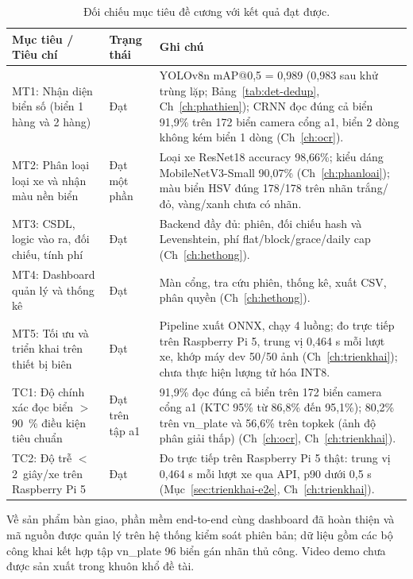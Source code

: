 \begin{table}[htbp]
\centering
\caption{Đối chiếu mục tiêu đề cương với kết quả đạt được.}

\label{tab:muctieu}
\begin{tabular}{p{5cm}p{2cm}p{6cm}}
\toprule
\textbf{Mục tiêu / Tiêu chí} & \textbf{Trạng thái} & \textbf{Ghi chú} \\
\midrule
MT1: Nhận diện biển số (biển 1 hàng và 2 hàng) & Đạt & YOLOv8n mAP@0,5 = 0,989 (0,983 sau khử trùng lặp; Bảng~\ref{tab:det-dedup}, Ch~\ref{ch:phathien}); CRNN đọc đúng cả biển 91,9\% trên 172 biển camera cổng a1, biển 2 dòng không kém biển 1 dòng (Ch~\ref{ch:ocr}). \\
MT2: Phân loại loại xe và nhận màu nền biển & Đạt một phần & Loại xe ResNet18 accuracy 98,66\%; kiểu dáng MobileNetV3-Small 90,07\% (Ch~\ref{ch:phanloai}); màu biển HSV đúng 178/178 trên nhãn trắng/đỏ, vàng/xanh chưa có nhãn. \\
MT3: CSDL, logic vào ra, đối chiếu, tính phí & Đạt & Backend đầy đủ: phiên, đối chiếu hash và Levenshtein, phí flat/block/grace/daily cap (Ch~\ref{ch:hethong}). \\
MT4: Dashboard quản lý và thống kê & Đạt & Màn cổng, tra cứu phiên, thống kê, xuất CSV, phân quyền (Ch~\ref{ch:hethong}). \\
MT5: Tối ưu và triển khai trên thiết bị biên & Đạt & Pipeline xuất ONNX, chạy 4 luồng; đo trực tiếp trên Raspberry Pi 5, trung vị 0,464 s mỗi lượt xe, khớp máy dev 50/50 ảnh (Ch~\ref{ch:trienkhai}); chưa thực hiện lượng tử hóa INT8. \\
\midrule
TC1: Độ chính xác đọc biển $>$\SI{90}{\percent} điều kiện tiêu chuẩn & Đạt trên tập a1 & 91,9\% đọc đúng cả biển trên 172 biển camera cổng a1 (KTC 95\% từ 86,8\% đến 95,1\%); 80,2\% trên vn\_plate và 56,6\% trên topkek (ảnh độ phân giải thấp) (Ch~\ref{ch:ocr}, Ch~\ref{ch:trienkhai}). \\
TC2: Độ trễ $<$ \SI{2}{giây}/xe trên Raspberry Pi 5 & Đạt & Đo trực tiếp trên Raspberry Pi 5 thật: trung vị 0,464 s mỗi lượt xe qua API, p90 dưới 0,5 s (Mục~\ref{sec:trienkhai-e2e}, Ch~\ref{ch:trienkhai}). \\
\bottomrule
\end{tabular}
\end{table}

Về sản phẩm bàn giao, phần mềm end-to-end cùng dashboard đã hoàn thiện và mã nguồn được quản
lý trên hệ thống kiểm soát phiên bản; dữ liệu gồm các bộ công khai kết hợp tập vn\_plate 96
biển gán nhãn thủ công. Video demo chưa được sản xuất trong khuôn khổ đề tài.


